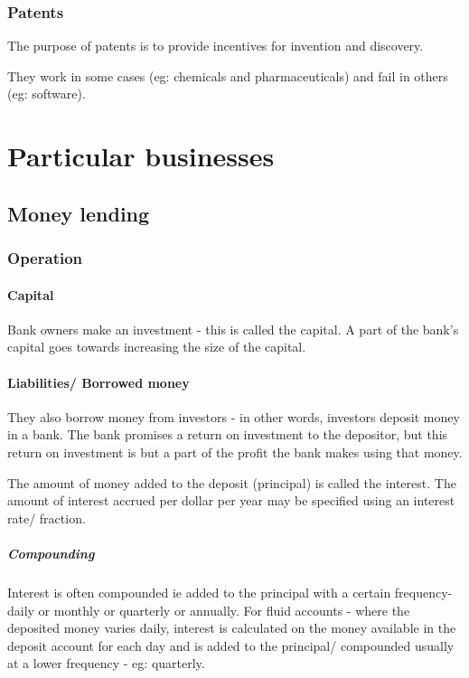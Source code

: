 \documentclass[oneside, article]{memoir}
\begin{document}
\section{Patents}
The purpose of patents is to provide incentives for invention and discovery.

They work in some cases (eg: chemicals and pharmaceuticals) and fail in others (eg: software).


\tbc

\part{Particular businesses}
\chapter{Money lending}
\section{Operation}
\subsection{Capital}
Bank owners make an investment - this is called the capital. A part of the bank's capital goes towards increasing the size of the capital.

\subsection{Liabilities/ Borrowed money}
They also borrow money from investors - in other words, investors deposit money in a bank. The bank promises a return on investment to the depositor, but this return on investment is but a part of the profit the bank makes using that money.

The amount of money added to the deposit (principal) is called the interest. The amount of interest accrued per dollar per year may be specified using an interest rate/ fraction.

\subsubsection{Compounding}
Interest is often compounded ie added to the principal with a certain frequency- daily or monthly or quarterly or annually. For fluid accounts - where the deposited money varies daily, interest is calculated on the money available in the deposit account for each day and is added to the principal/ compounded usually at a lower frequency - eg: quarterly.
\end{document}
